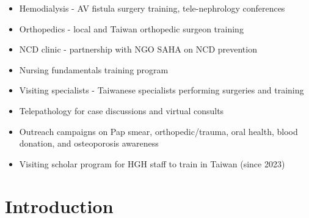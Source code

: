 \documentclass{article}
\begin{document}
\begin{itemize}
\item Hemodialysis - AV fistula surgery training, tele-nephrology conferences
\item Orthopedics - local and Taiwan orthopedic surgeon training
\item NCD clinic - partnership with NGO SAHA on NCD prevention
\item Nursing fundamentals training program
\item Visiting specialists - Taiwanese specialists performing surgeries and training
\item Telepathology for case discussions and virtual consults
\item Outreach campaigns on Pap smear, orthopedic/trauma, oral health, blood donation, and osteoporosis awareness
\item Visiting scholar program for HGH staff to train in Taiwan (since 2023)
\end{itemize}






\section{Introduction}
\end{document}
